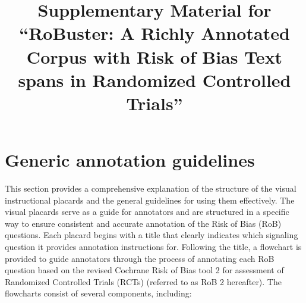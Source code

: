 \documentclass[sn-mathphys,Numbered]{sn-jnl}%
\begin{document}
\title[Article Title]{Supplementary Material for ``RoBuster: A Richly Annotated Corpus with Risk of Bias Text spans in Randomized Controlled Trials''}



\maketitle


\section*{Generic annotation guidelines}
\label{sec:generic}
%
This section provides a comprehensive explanation of the structure of the visual instructional placards and the general guidelines for using them effectively.
The visual placards serve as a guide for annotators and are structured in a specific way to ensure consistent and accurate annotation of the Risk of Bias (RoB) questions.
Each placard begins with a title that clearly indicates which signaling question it provides annotation instructions for. 
Following the title, a flowchart is provided to guide annotators through the process of annotating each RoB question based on the revised Cochrane Risk of Bias tool 2 for assessment of Randomized Controlled Trials (RCTs) (referred to as RoB 2 hereafter).
The flowcharts consist of several components, including:
%
%
%
\end{document}
